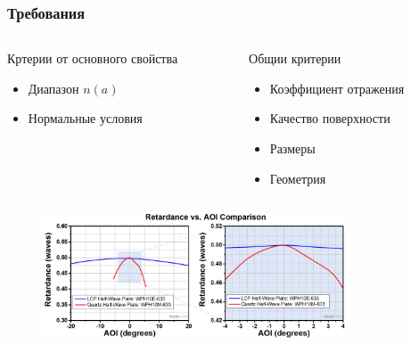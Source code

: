 \documentclass[handout]{beamer}
\begin{document}
\begin{frame}
    \frametitle{Требования}
    \begin{columns}
        \begin{column}{0.5\textwidth}
            Кртерии от основного свойства 
            \begin{itemize}
                \item Диапазон $n(a)$
                \item Нормальные условия
            \end{itemize}
        \end{column}
        
        \begin{column}{0.5\textwidth}
            Общии критерии 
            \begin{itemize}
                \item Коэффициент отражения
                \item Качество поверхности
                \item Размеры
                \item Геометрия
            \end{itemize}
        \end{column}
    \end{columns}

    \begin{figure}[h]
        \centering
        \includegraphics[width=0.8\textwidth]{n_w.jpg}
    \end{figure}

\end{frame}
\end{document}
